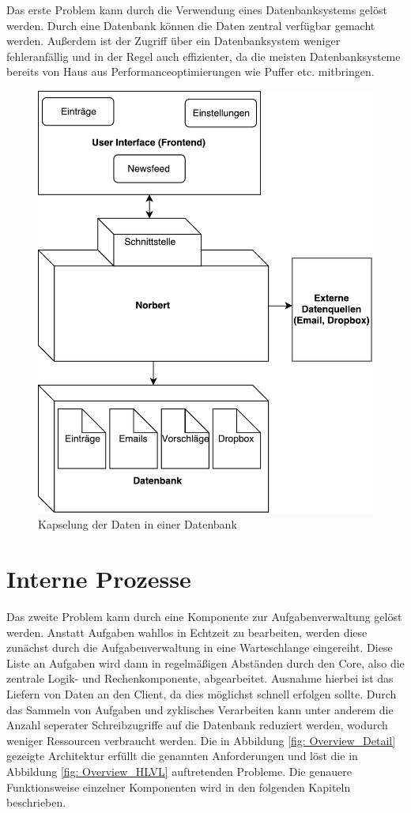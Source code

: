 Das erste Problem kann durch die Verwendung eines Datenbanksystems gelöst werden. Durch eine Datenbank können die Daten zentral verfügbar gemacht werden. Außerdem ist der Zugriff über ein Datenbanksystem weniger fehleranfällig und in der Regel auch effizienter, da die meisten Datenbanksysteme bereits von Haus aus Performanceoptimierungen wie Puffer etc. mitbringen. 
\begin{figure}[H]
\centering
\includegraphics[scale=0.75]{uml-diagramms/daten_hlvl.pdf}
\caption{Kapselung der Daten in einer Datenbank}
\label{fig: DB_HLVL}
\end{figure}

\section{Interne Prozesse}

Das zweite Problem kann durch eine Komponente zur Aufgabenverwaltung gelöst werden. Anstatt Aufgaben wahllos in Echtzeit zu bearbeiten, werden diese zunächst durch die Aufgabenverwaltung in eine Warteschlange eingereiht. Diese Liste an Aufgaben wird dann in regelmäßigen Abständen durch den Core, also die zentrale Logik- und Rechenkomponente, abgearbeitet. Ausnahme hierbei ist das Liefern von Daten an den Client, da dies möglichst schnell erfolgen sollte. Durch das Sammeln von Aufgaben und zyklisches Verarbeiten kann unter anderem die Anzahl seperater Schreibzugriffe auf die Datenbank reduziert werden, wodurch weniger Ressourcen verbraucht werden. Die in Abbildung \ref{fig: Overview_Detail} gezeigte Architektur erfüllt die genannten Anforderungen und löst die in Abbildung \ref{fig: Overview_HLVL} auftretenden Probleme. Die genauere Funktionsweise einzelner Komponenten wird in den folgenden Kapiteln beschrieben.

